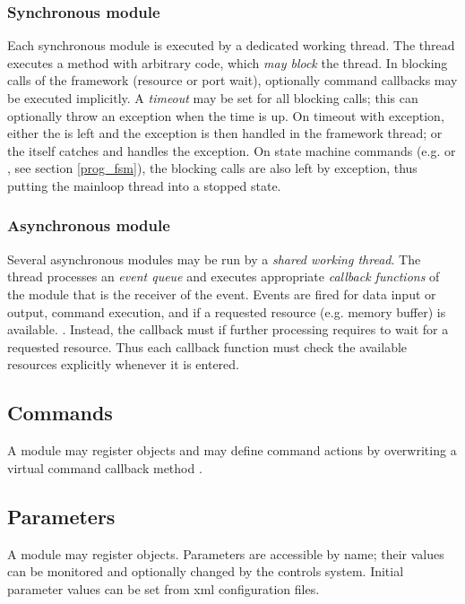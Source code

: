 \subsubsection{Synchronous module} 
Each synchronous module is executed by a 
dedicated working thread. The thread executes a
 method  with arbitrary code, which {\sl may block} 
the thread. In blocking calls of the framework (resource or 
port wait), optionally command callbacks may be executed 
implicitly.
A {\sl timeout} may be set for all blocking calls; this can 
optionally throw an exception when the time is up. On timeout 
with exception, either the  is left and the exception 
is then handled in the framework thread; or the  itself 
catches and handles the exception. On state machine commands (e.g. 
 or , see section \ref{prog_fsm}), 
the blocking calls are also left by exception, 
thus putting the mainloop thread into a stopped state.

\subsubsection{Asynchronous module}
 Several asynchronous modules may be run by a {\sl shared working thread}. 
The thread processes an  {\sl event queue} and executes 
appropriate  {\sl callback functions} 
of the module that is the receiver of the event. Events are fired for data input 
or output, command execution, and if a requested resource (e.g. memory buffer) 
is available. . 
Instead, the callback must  if further processing requires 
to wait for a requested resource. Thus each callback function must check the 
available resources explicitly whenever it is entered.
           
\subsection{Commands}
A module may register  objects and may define 
command actions by overwriting a virtual command callback method .

\subsection{Parameters}
A module may register   objects. 
Parameters are accessible by name; their values can be monitored and optionally changed by 
the controls system. Initial parameter values can be set from xml configuration files.   

